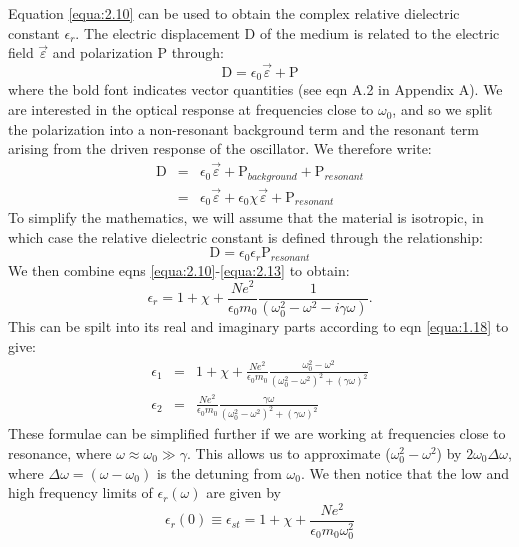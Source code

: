\documentclass[12pt]{book}
\begin{document}
Equation \ref{equa:2.10} can be used to obtain the complex relative dielectric constant $\epsilon_r$. The electric displacement $\mathrm{D}$ of the medium is related to the electric field $\vec{\varepsilon}$ and polarization $\mathrm{P}$ through:
\begin{equation}\label{equa:2.11}
  \mathrm{D}=\epsilon_0\vec{\varepsilon}+\mathrm{P}
\end{equation}
where the bold font indicates vector quantities (see eqn A.2 in Appendix A). We are interested in the optical response at frequencies close to $\omega_0$, and so we split the polarization into a non-resonant background term and the resonant term arising from the driven response of the oscillator. We therefore  write:
\begin{eqnarray}\label{equa:2.12}
\nonumber  \mathrm{D} &=& \epsilon_0\vec{\varepsilon}+\mathrm{P}_{background}+\mathrm{P}_{resonant} \\
  &=& \epsilon_0\vec{\varepsilon}+\epsilon_0\chi\vec{\varepsilon}+\mathrm{P}_{resonant}
\end{eqnarray}
To simplify the mathematics, we will assume that the material is isotropic, in which case the relative dielectric constant is defined through the relationship:
\begin{equation}\label{equa:2.13}
  \mathrm{D}=\epsilon_0\epsilon_r\mathrm{P}_{resonant}
\end{equation}
We then combine eqns \ref{equa:2.10}-\ref{equa:2.13} to obtain:
\begin{equation}\label{equa:2.14}
  \epsilon_r=1+\chi+\frac{Ne^2}{\epsilon_0m_0}\frac{1}{(\omega_0^2-\omega^2-i\gamma\omega)}.
\end{equation}
This can be spilt into its real and imaginary parts according to eqn \ref{equa:1.18} to give:
\begin{eqnarray}
  \epsilon_1 &=& 1+\chi+\frac{Ne^2}{\epsilon_0m_0}\frac{\omega_0^2-\omega^2}{(\omega_0^2-\omega^2)^2+(\gamma\omega)^2}  \label{equa:2.15}\\
  \epsilon_2 &=& \frac{Ne^2}{\epsilon_0m_0}\frac{\gamma\omega}{(\omega_0^2-\omega^2)^2+(\gamma\omega)^2} \label{equa:2.16}
\end{eqnarray}
These formulae can be simplified further if we are working at frequencies close to resonance, where $\omega\approx\omega_0\gg\gamma$. This allows us to approximate ($\omega_0^2-\omega^2$) by $2\omega_0\Delta\omega$, where $\Delta\omega=(\omega-\omega_0)$ is the detuning from $\omega_0$. We then notice that the low and high frequency limits of $\epsilon_r(\omega)$ are given by
\begin{equation}\label{equa:2.17}
  \epsilon_r(0)\equiv\epsilon_{st}=1+\chi+\frac{Ne^2}{\epsilon_0m_0\omega_0^2}
\end{equation}
\end{document}
